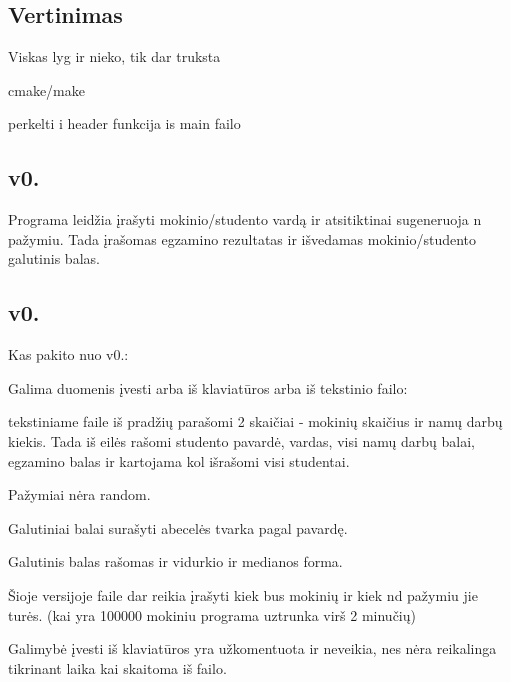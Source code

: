 \subsection*{Vertinimas}


\begin{DoxyItemize}
\item Viskas lyg ir nieko, tik dar truksta
\begin{DoxyItemize}
\item cmake/make
\item perkelti i header funkcija is main failo
\end{DoxyItemize}
\end{DoxyItemize}

\subsection*{v0.}

Programa leidžia įrašyti mokinio/studento vardą ir atsitiktinai sugeneruoja n pažymiu. Tada įrašomas egzamino rezultatas ir išvedamas mokinio/studento galutinis balas.

\subsection*{v0.}

Kas pakito nuo v0.\+:


\begin{DoxyItemize}
\item Galima duomenis įvesti arba iš klaviatūros arba iš tekstinio failo\+:
\begin{DoxyItemize}
\item tekstiniame faile iš pradžių parašomi 2 skaičiai -\/ mokinių skaičius ir namų darbų kiekis. Tada iš eilės rašomi studento pavardė, vardas, visi namų darbų balai, egzamino balas ir kartojama kol išrašomi visi studentai.
\end{DoxyItemize}
\item Pažymiai nėra random.
\item Galutiniai balai surašyti abecelės tvarka pagal pavardę.
\item Galutinis balas rašomas ir vidurkio ir medianos forma.
\end{DoxyItemize}

Šioje versijoje faile dar reikia įrašyti kiek bus mokinių ir kiek nd pažymiu jie turės. (kai yra 100000 mokiniu programa uztrunka virš 2 minučių)
\begin{DoxyItemize}
\item Galimybė įvesti iš klaviatūros yra užkomentuota ir neveikia, nes nėra reikalinga tikrinant laika kai skaitoma iš failo.
\end{DoxyItemize}

